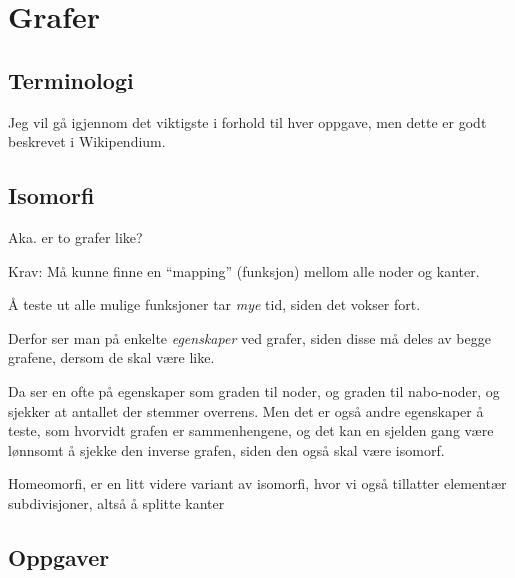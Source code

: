 \section{Grafer}

\subsection{Terminologi}
Jeg vil gå igjennom det viktigste i forhold til hver oppgave, men dette er godt beskrevet i Wikipendium.
\subsection{Isomorfi}

Aka. er to grafer like?

\noindent Krav: Må kunne finne en \enquote{mapping} (funksjon) mellom alle noder og kanter.

Å teste ut alle mulige funksjoner tar \textit{mye} tid, siden det vokser fort.

Derfor ser man på enkelte \textit{egenskaper} ved grafer, siden disse må deles av begge grafene,
dersom de skal være like.

Da ser en ofte på egenskaper som graden til noder, og graden til nabo-noder, og sjekker at antallet der stemmer overrens.
Men det er også andre egenskaper å teste, som hvorvidt grafen er sammenhengene, og det kan en sjelden gang være lønnsomt å sjekke
den inverse grafen, siden den også skal være isomorf.

Homeomorfi, er en litt videre variant av isomorfi, hvor vi også tillatter elementær subdivisjoner, altså å splitte kanter


\subsection{Oppgaver}

